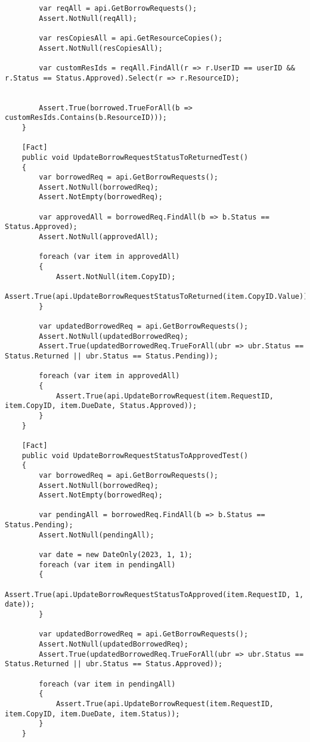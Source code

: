 \begin{verbatim}
        var reqAll = api.GetBorrowRequests();
        Assert.NotNull(reqAll);

        var resCopiesAll = api.GetResourceCopies();
        Assert.NotNull(resCopiesAll);

        var customResIds = reqAll.FindAll(r => r.UserID == userID && r.Status == Status.Approved).Select(r => r.ResourceID);


        Assert.True(borrowed.TrueForAll(b => customResIds.Contains(b.ResourceID)));
    }

    [Fact]
    public void UpdateBorrowRequestStatusToReturnedTest()
    {
        var borrowedReq = api.GetBorrowRequests();
        Assert.NotNull(borrowedReq);
        Assert.NotEmpty(borrowedReq);

        var approvedAll = borrowedReq.FindAll(b => b.Status == Status.Approved);
        Assert.NotNull(approvedAll);

        foreach (var item in approvedAll)
        {
            Assert.NotNull(item.CopyID);
            Assert.True(api.UpdateBorrowRequestStatusToReturned(item.CopyID.Value));
        }

        var updatedBorrowedReq = api.GetBorrowRequests();
        Assert.NotNull(updatedBorrowedReq);
        Assert.True(updatedBorrowedReq.TrueForAll(ubr => ubr.Status == Status.Returned || ubr.Status == Status.Pending));

        foreach (var item in approvedAll)
        {
            Assert.True(api.UpdateBorrowRequest(item.RequestID, item.CopyID, item.DueDate, Status.Approved));
        }
    }

    [Fact]
    public void UpdateBorrowRequestStatusToApprovedTest()
    {
        var borrowedReq = api.GetBorrowRequests();
        Assert.NotNull(borrowedReq);
        Assert.NotEmpty(borrowedReq);

        var pendingAll = borrowedReq.FindAll(b => b.Status == Status.Pending);
        Assert.NotNull(pendingAll);

        var date = new DateOnly(2023, 1, 1);
        foreach (var item in pendingAll)
        {
            Assert.True(api.UpdateBorrowRequestStatusToApproved(item.RequestID, 1, date));
        }

        var updatedBorrowedReq = api.GetBorrowRequests();
        Assert.NotNull(updatedBorrowedReq);
        Assert.True(updatedBorrowedReq.TrueForAll(ubr => ubr.Status == Status.Returned || ubr.Status == Status.Approved));

        foreach (var item in pendingAll)
        {
            Assert.True(api.UpdateBorrowRequest(item.RequestID, item.CopyID, item.DueDate, item.Status));
        }
    }


\end{verbatim}
